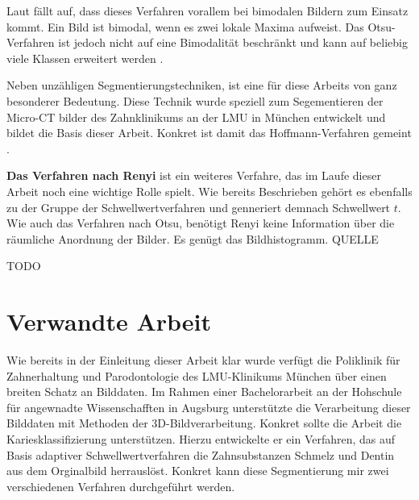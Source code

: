 Laut \citet[Seite264]{lehmann2013bildverarbeitung} fällt auf, dass dieses
Verfahren vorallem bei bimodalen Bildern zum Einsatz kommt. Ein Bild ist bimodal,
wenn es zwei lokale Maxima aufweist. Das Otsu-Verfahren ist jedoch nicht auf eine
Bimodalität beschränkt und kann auf beliebig viele Klassen erweitert werden \citep[vgl.][Seite264]{lehmann2013bildverarbeitung}.

Neben unzähligen Segmentierungstechniken, ist eine für diese Arbeits von ganz
besonderer Bedeutung. Diese Technik wurde speziell zum Segementieren der Micro-CT
bilder des Zahnklinikums an der LMU in München entwickelt und bildet die Basis dieser
Arbeit. Konkret ist damit das Hoffmann-Verfahren gemeint \citep[vgl.][]{hoffmann2020}.

\textbf{Das Verfahren nach Renyi} ist ein weiteres Verfahre, das im Laufe dieser
Arbeit noch eine wichtige Rolle spielt. Wie bereits Beschrieben gehört es
ebenfalls zu der Gruppe der Schwellwertverfahren und genneriert demnach
Schwellwert $t$. Wie auch das Verfahren nach Otsu, benötigt Renyi keine
Information über die räumliche Anordnung der Bilder. Es genügt das Bildhistogramm.
QUELLE

TODO

\pagebreak

\section{Verwandte Arbeit}
\label{sec:verwwandte_arbeit} Wie bereits in der Einleitung dieser Arbeit klar wurde
verfügt die Poliklinik für Zahnerhaltung und Parodontologie des LMU-Klinikums München
über einen breiten Schatz an Bilddaten. Im Rahmen einer Bachelorarbeit an der
Hohschule für angewnadte Wissenschafften in Augsburg unterstützte \citet{hoffmann2020}
die Verarbeitung dieser Bilddaten mit Methoden der 3D-Bildverarbeitung. Konkret
sollte die Arbeit die Kariesklassifizierung unterstützen. Hierzu entwickelte er ein
Verfahren, das auf Basis adaptiver Schwellwertverfahren die Zahnsubstanzen
Schmelz und Dentin aus dem Orginalbild herrauslöst. Konkret kann diese Segmentierung
mir zwei verschiedenen Verfahren durchgeführt werden.

